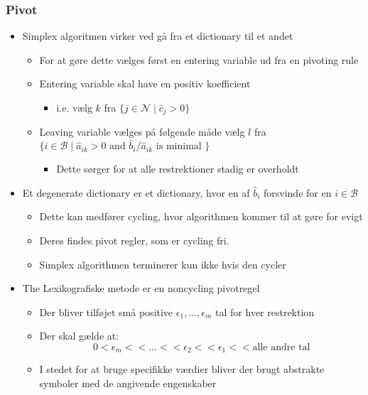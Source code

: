 \subsubsection{Pivot}
\begin{itemize}
	\item Simplex algoritmen virker ved gå fra et dictionary til et andet 
  \begin{itemize}
  	\item For at gøre dette vælges først en entering variable ud fra en pivoting rule 
    \item Entering variable skal have en positiv koefficient
    \begin{itemize}
    	\item i.e. vælg $k$ fra $\{j \in \mathcal N \mid \bar c_j > 0 \}$
    \end{itemize}
    \item Leaving variable vælges på følgende måde vælg $l$ fra $\{i \in \mathcal B \mid \hat a_{ik} > 0 \text{ and } \hat b_i / \hat a_{ik} \text{ is minimal }\}$
    \begin{itemize}
    	\item Dette sørger for at alle restrektioner stadig er overholdt
    \end{itemize}
  \end{itemize}
  \item Et degenerate dictionary er et dictionary, hvor en af $\hat b_i$ forsvinde for en $i \in \mathcal B$
  \begin{itemize}
  	\item Dette kan medfører cycling, hvor algorithmen kommer til at gøre for evigt
    \item Deres findes pivot regler, som er cycling fri.
    \item Simplex algorithmen terminerer kun ikke hvis den cycler  
  \end{itemize}
  \item The Lexikografiske metode er en noncycling pivotregel 
  \begin{itemize}
  	\item Der bliver tilføjet små positive $\epsilon_1, \dots, \epsilon_m$ tal for hver restrektion
    \item Der skal gælde at: 
    \begin{equation*}
      0<\epsilon_m << \dots << \epsilon_2 << \epsilon_1 <<  \text{alle andre tal} 
    \end{equation*}
    \item I stedet for at bruge specifikke værdier bliver der brugt abstrakte symboler med de angivende engenskaber  

\end{itemize}
\end{itemize}
